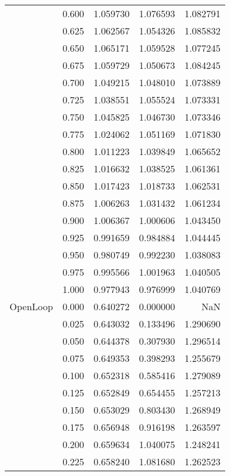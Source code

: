 \begin{tabular}{llrrr}
         & 0.600 &   1.059730 &   1.076593 &   1.082791 \\
         & 0.625 &   1.062567 &   1.054326 &   1.085832 \\
         & 0.650 &   1.065171 &   1.059528 &   1.077245 \\
         & 0.675 &   1.059729 &   1.050673 &   1.084245 \\
         & 0.700 &   1.049215 &   1.048010 &   1.073889 \\
         & 0.725 &   1.038551 &   1.055524 &   1.073331 \\
         & 0.750 &   1.045825 &   1.046730 &   1.073346 \\
         & 0.775 &   1.024062 &   1.051169 &   1.071830 \\
         & 0.800 &   1.011223 &   1.039849 &   1.065652 \\
         & 0.825 &   1.016632 &   1.038525 &   1.061361 \\
         & 0.850 &   1.017423 &   1.018733 &   1.062531 \\
         & 0.875 &   1.006263 &   1.031432 &   1.061234 \\
         & 0.900 &   1.006367 &   1.000606 &   1.043450 \\
         & 0.925 &   0.991659 &   0.984884 &   1.044445 \\
         & 0.950 &   0.980749 &   0.992230 &   1.038083 \\
         & 0.975 &   0.995566 &   1.001963 &   1.040505 \\
         & 1.000 &   0.977943 &   0.976999 &   1.040769 \\
OpenLoop & 0.000 &   0.640272 &   0.000000 &        NaN \\
         & 0.025 &   0.643032 &   0.133496 &   1.290690 \\
         & 0.050 &   0.644378 &   0.307930 &   1.296514 \\
         & 0.075 &   0.649353 &   0.398293 &   1.255679 \\
         & 0.100 &   0.652318 &   0.585416 &   1.279089 \\
         & 0.125 &   0.652849 &   0.654455 &   1.257213 \\
         & 0.150 &   0.653029 &   0.803430 &   1.268949 \\
         & 0.175 &   0.656948 &   0.916198 &   1.263597 \\
         & 0.200 &   0.659634 &   1.040075 &   1.248241 \\
         & 0.225 &   0.658240 &   1.081680 &   1.262523 \\

\end{tabular}
